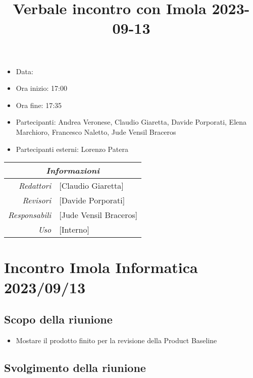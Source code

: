 \documentclass[12pt]{article}
\begin{document}
\graphicspath{ {../../templates/img} }

\title{Verbale incontro con Imola 2023-09-13}
\firstPage
\maketitle

\begin{center}
    \begin{itemize}
        \item[] Data: 
        \item[] Ora inizio: 17:00
        \item[] Ora fine: 17:35
        \item[] Partecipanti: Andrea Veronese, Claudio Giaretta, Davide Porporati, Elena Marchioro, Francesco Naletto, Jude Vensil Braceros
        \item[] Partecipanti esterni: Lorenzo Patera
        \end{itemize}
    \begin{tabular}{r | l}
		\multicolumn{2}{c}{\textit{Informazioni}}\\
		\hline
		
			\textit{Redattori} &
			[Claudio Giaretta]\makecell{}\\
		
			\textit{Revisori} &
			[Davide Porporati]\makecell{}\\
			\textit{Responsabili} &
			[Jude Vensil Braceros]\makecell{}\\
		      \textit{Uso} & 
                [Interno]\makecell{}\\
\end{tabular}
\end{center}

\tableofcontents
\printindex
\section{Incontro Imola Informatica 2023/09/13}
\subsection{Scopo della riunione}
\begin{itemize}
    \item Mostare il prodotto finito per la revisione della Product Baseline
\end{itemize}
\subsection{Svolgimento della riunione}
\end{document}
